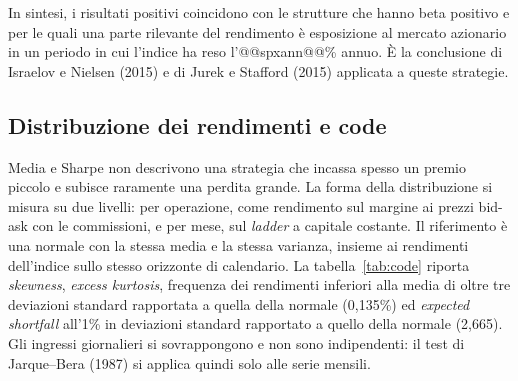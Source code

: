 \documentclass[11pt,a4paper]{article}
\begin{document}
In sintesi, i risultati positivi coincidono con le strutture che hanno beta positivo e per le quali una parte rilevante del rendimento è esposizione al mercato azionario in un periodo in cui l'indice ha reso l'@@spxann@@\% annuo. È la conclusione di Israelov e Nielsen (2015) e di Jurek e Stafford (2015) applicata a queste strategie.

\subsection{Distribuzione dei rendimenti e code}\label{sec:code}

Media e Sharpe non descrivono una strategia che incassa spesso un premio piccolo e subisce raramente una perdita grande. La forma della distribuzione si misura su due livelli: per operazione, come rendimento sul margine ai prezzi bid-ask con le commissioni, e per mese, sul \emph{ladder} a capitale costante. Il riferimento è una normale con la stessa media e la stessa varianza, insieme ai rendimenti dell'indice sullo stesso orizzonte di calendario. La tabella~\ref{tab:code} riporta \emph{skewness}, \emph{excess kurtosis}, frequenza dei rendimenti inferiori alla media di oltre tre deviazioni standard rapportata a quella della normale (0{,}135\%) ed \emph{expected shortfall} all'1\% in deviazioni standard rapportato a quello della normale (2{,}665). Gli ingressi giornalieri si sovrappongono e non sono indipendenti: il test di Jarque--Bera (1987) si applica quindi solo alle serie mensili.

\begin{table}[ht]\centering\footnotesize
\caption{Forma della distribuzione dei rendimenti. Per operazione: rendimento sul margine ai prezzi bid-ask, commissioni incluse; frequenza dei rendimenti inferiori alla media di oltre tre deviazioni standard ed \emph{expected shortfall} all'1\% in deviazioni standard, entrambi rapportati alla normale; operazione peggiore in percentuale del margine. Mensile: \emph{ladder} a capitale costante; $p$-value del test di Jarque--Bera. Ultima riga: rendimenti a 30 giorni dell'S\&P 500 da ogni seduta e rendimenti mensili di prezzo.}\label{tab:code}
\end{table}
\end{document}
